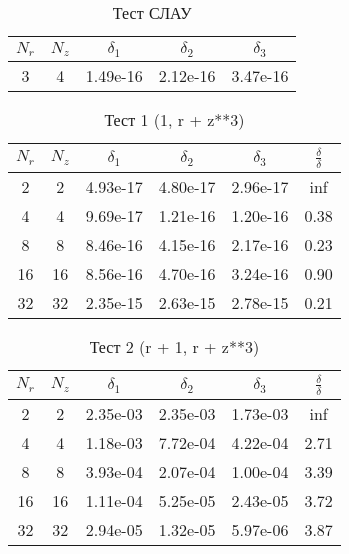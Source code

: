 \begin{table}[H]
  \begin{center}
    \begin{tabular}{*{5}c}
      \toprule
      $ N_r $ & $ N_z $ & $ \delta_1 $ & $ \delta_2 $ & $ \delta_3 $ \\
      \midrule
3&4&1.49e-16&2.12e-16&3.47e-16\\
      \bottomrule
    \end{tabular}
    \caption{Тест СЛАУ}
  \end{center}
\end{table}
\begin{table}[H]
  \begin{center}
    \begin{tabular}{*{6}c}
      \toprule
      $ N_r $ & $ N_z $ & $ \delta_1 $ & $ \delta_2 $ & $ \delta_3 $ & $\frac{\delta}{\delta}$ \\
      \midrule
2&2&4.93e-17&4.80e-17&2.96e-17&inf\\
4&4&9.69e-17&1.21e-16&1.20e-16&0.38\\
8&8&8.46e-16&4.15e-16&2.17e-16&0.23\\
16&16&8.56e-16&4.70e-16&3.24e-16&0.90\\
32&32&2.35e-15&2.63e-15&2.78e-15&0.21\\
      \bottomrule
    \end{tabular}
    \caption{Тест 1 (1, r + z**3)}
  \end{center}
\end{table}
\begin{table}[H]
  \begin{center}
    \begin{tabular}{*{6}c}
      \toprule
      $ N_r $ & $ N_z $ & $ \delta_1 $ & $ \delta_2 $ & $ \delta_3 $ & $\frac{\delta}{\delta}$ \\
      \midrule
2&2&2.35e-03&2.35e-03&1.73e-03&inf\\
4&4&1.18e-03&7.72e-04&4.22e-04&2.71\\
8&8&3.93e-04&2.07e-04&1.00e-04&3.39\\
16&16&1.11e-04&5.25e-05&2.43e-05&3.72\\
32&32&2.94e-05&1.32e-05&5.97e-06&3.87\\
      \bottomrule
    \end{tabular}
    \caption{Тест 2 (r + 1, r + z**3)}
  \end{center}
\end{table}
